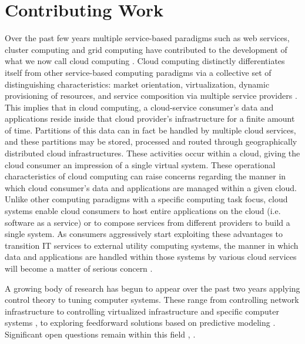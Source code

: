 \documentclass{sig-alternate}
\begin{document}
\section{Contributing Work}\label{sec:motivation}
Over the past few years multiple service-based paradigms such as web services, cluster computing and grid computing have contributed to the development of what we now call cloud computing \cite{Bu:09}. Cloud computing distinctly differentiates itself from other service-based computing paradigms via a collective set of distinguishing characteristics:  market orientation, virtualization, dynamic provisioning of resources, and service composition via multiple service providers \cite{BuYeVeBrBr:09}. This implies that in cloud computing, a cloud-service consumer's data and applications reside inside that cloud provider's infrastructure for a finite amount of time.  Partitions of this data can in fact be handled by multiple cloud services, and these partitions may be stored, processed and routed through geographically distributed cloud infrastructures. These activities occur within a cloud, giving the cloud consumer an impression of a single virtual system.  These operational characteristics of cloud computing can raise concerns regarding the manner in which cloud consumer's data and applications are managed within a given cloud. Unlike other computing paradigms with a specific computing task focus, cloud systems enable cloud consumers to host entire applications on the cloud (i.e. software as a service) or to compose services from different providers to build a single system. As consumers aggressively start exploiting these advantages to transition IT services to external utility computing systems, the manner in which data and applications are handled within those systems by various cloud services will become a matter of serious concern \cite{Jamkhedkar:2010:IUM:1866870.1866885}.

A growing body of research has begun to appear over the past two years applying control theory to tuning computer systems.  These range from controlling network infrastructure \cite{ctrl:ariba-GL:2009} to controlling virtualized infrastructure and specific computer systems \cite{ctrl:wang-cgswrzh:2009}, \cite{ctrl:kjaer-kr:2009} to exploring feedforward solutions based on predictive modeling \cite{ctrl:abdelwahed-bsk:2009}.  Significant open questions remain within this field \cite{ctrl:Zhu:2009:CTB:1496909.1496922}, \cite{ctrl:hellerstein-sw:2009}.
\end{document}
